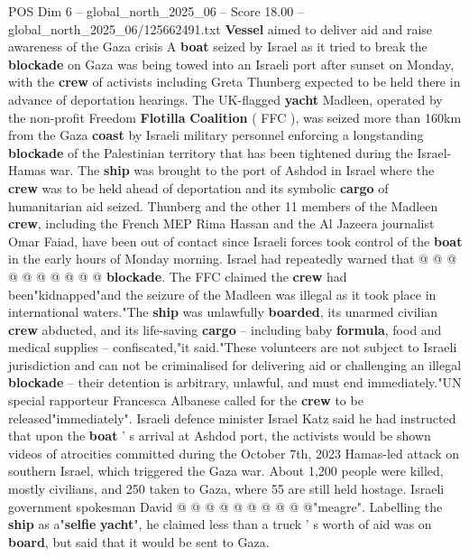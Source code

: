 \begin{textsample}{POS Dim 6 – global\_north\_2025\_06 – Score 18.00 – global\_north\_2025\_06/125662491.txt}  \label{ex:f6_pos_025}
\textbf{Vessel} aimed to deliver aid and raise awareness of the Gaza crisis A \textbf{boat} seized by Israel as it tried to break the \textbf{blockade} on Gaza was being towed into an Israeli port after sunset on Monday, with the \textbf{crew} of activists including Greta Thunberg expected to be held there in advance of deportation hearings.
The UK-flagged \textbf{yacht} Madleen, operated by the non-profit Freedom \textbf{Flotilla} \textbf{Coalition} ( FFC ), was seized more than 160km from the Gaza \textbf{coast} by Israeli military personnel enforcing a longstanding \textbf{blockade} of the Palestinian territory that has been tightened during the Israel-Hamas war.
The \textbf{ship} was brought to the port of Ashdod in Israel where the \textbf{crew} was to be held ahead of deportation and its symbolic \textbf{cargo} of humanitarian aid seized.
Thunberg and the other 11 members of the Madleen \textbf{crew}, including the French MEP Rima Hassan and the Al Jazeera journalist Omar Faiad, have been out of contact since Israeli forces took control of the \textbf{boat} in the early hours of Monday morning.
Israel had repeatedly warned that @ @ @ @ @ @ @ @ @ @ \textbf{blockade}.
The FFC claimed the \textbf{crew} had been"kidnapped"and the seizure of the Madleen was illegal as it took place in international waters."The \textbf{ship} was unlawfully \textbf{boarded}, its unarmed civilian \textbf{crew} abducted, and its life-saving \textbf{cargo} -- including baby \textbf{formula}, food and medical supplies -- confiscated,"it said."These volunteers are not subject to Israeli jurisdiction and can not be criminalised for delivering aid or challenging an illegal \textbf{blockade} -- their detention is arbitrary, unlawful, and must end immediately."UN special rapporteur Francesca Albanese called for the \textbf{crew} to be released"immediately".
Israeli defence minister Israel Katz said he had instructed that upon the \textbf{boat} ' s arrival at Ashdod port, the activists would be shown videos of atrocities committed during the October 7th, 2023 Hamas-led attack on southern Israel, which triggered the Gaza war.
About 1,200 people were killed, mostly civilians, and 250 taken to Gaza, where 55 are still held hostage.
Israeli government spokesman David @ @ @ @ @ @ @ @ @ @"meagre".
Labelling the \textbf{ship} as a"\textbf{selfie} \textbf{yacht}", he claimed less than a truck ' s worth of aid was on \textbf{board}, but said that it would be sent to Gaza.

\end{textsample}
